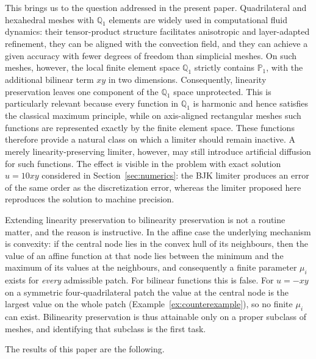 \documentclass[a4paper]{article}
\theoremstyle{plain}
\theoremstyle{definition}
\theoremstyle{remark}
\begin{document}
This brings us to the question addressed in the present paper. Quadrilateral and hexahedral meshes with $\mathbb{Q}_1$ elements are widely used in computational fluid dynamics: their tensor-product structure facilitates anisotropic and layer-adapted refinement, they can be aligned with the convection field, and they can achieve a given accuracy with fewer degrees of freedom than simplicial meshes. On such meshes, however, the local finite element space $\mathbb{Q}_1$ strictly contains $\mathbb{P}_1$, with the additional bilinear term $xy$ in two dimensions. Consequently, linearity preservation leaves one component of the $\mathbb{Q}_1$ space unprotected. This is particularly relevant because every function in $\mathbb{Q}_1$ is harmonic and hence satisfies the classical maximum principle, while on axis-aligned rectangular meshes such functions are represented exactly by the finite element space. These functions therefore provide a natural class on which a limiter should remain inactive. A merely linearity-preserving limiter, however, may still introduce artificial diffusion for such functions. The effect is visible in the problem with exact solution $u=10xy$ considered in Section~\ref{sec:numerics}: the BJK limiter produces an error of the same order as the discretization error, whereas the limiter proposed here reproduces the solution to machine precision.

Extending linearity preservation to bilinearity preservation is not a routine matter,
and the reason is instructive. In the affine case the underlying mechanism is
convexity: if the central node lies in the convex hull of its neighbours, then the
value of an affine function at that node lies between the minimum and the maximum of
its values at the neighbours, and consequently a finite parameter $\mu_i$ exists for
\emph{every} admissible patch. For bilinear functions this is false. For $u=-xy$ on a
symmetric four-quadrilateral patch the value at the central node is the largest value
on the whole patch (Example~\ref{ex:counterexample}), so no finite $\mu_i$ can exist.
Bilinearity preservation is thus attainable only on a proper subclass of meshes, and
identifying that subclass is the first task.

The results of this paper are the following.
\end{document}
